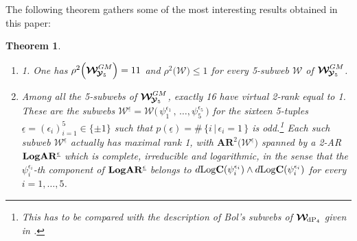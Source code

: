 \documentclass[11pt]{amsart}
\newcommand{\mk}{\medskip}
\newtheorem{thm}{Theorem}[section]
\begin{document}
The following theorem gathers some of the most interesting results obtained in this paper: 
\begin{thm} 
\label{THM:WdP5-WGMS5-similarities}
%
%
\begin{enumerate}
\item[]  \hspace{-1.2cm} {\rm 1.} One has  $\rho^{2}\Big(
\boldsymbol{\mathcal W}^{GM}_{ \hspace{-0.05cm}
\boldsymbol{\mathcal Y}_5}
\Big)= 11$ 
and $\rho^{2}\big(
\boldsymbol{\mathcal W}
\big)\leq 1$  for every 5-subweb  $\boldsymbol{\mathcal W}$ of $\boldsymbol{\mathcal W}^{GM}_{ \hspace{-0.05cm}
\boldsymbol{\mathcal Y}_5}$. 
\mk 
\item[2.] Among all the %
 5-subwebs of $\boldsymbol{\mathcal W}^{GM}_{ \hspace{-0.05cm}
\boldsymbol{\mathcal Y}_5}$, exactly 16 have virtual 2-rank equal to 1. These are the subwebs $\boldsymbol{\mathcal W}^{\underline{\epsilon}}=\boldsymbol{\mathcal W}\big(\, \psi_1^{\epsilon_1}\, , \, \ldots,  
\psi_5^{\epsilon_5}\,\big)$ for the sixteen 5-tuples $\underline{\epsilon}=(\epsilon_i)_{i=1}^5\in \{\pm 1\}$
such that $p(\underline{\epsilon})=\#\,\{ i%
 \, \lvert \, \epsilon_i=1\,\}$ is odd.\footnote{This has to be compared with the description of Bol's subwebs of 
$\boldsymbol{\mathcal W}_{  \hspace{-0.05cm} {\rm dP}_4}$ given in 
\cite[\S4.3]{PirioAFST}.} Each such subweb $\boldsymbol{\mathcal W}^{\underline{\epsilon}}$ actually  has maximal rank 1, with 
$\boldsymbol{AR}^{2}\big( \boldsymbol{\mathcal W}^{\underline{\epsilon}}\big)$
spanned by 
a
 2-AR %
${\bf LogAR}^{\underline{\epsilon}}$ which is complete, irreducible and logarithmic, in the sense  that the $\psi_i^{\epsilon_i}$-th component of 
 ${\bf LogAR}^{\underline{\epsilon}}$
belongs to $d{\rm Log}\mathbf C(\psi_i^{\epsilon_i})\wedge d{\rm Log}\mathbf C(\psi_i^{\epsilon_i})$  for every $i=1,\ldots,5$. 
\mk

\end{enumerate}
\end{thm}
\end{document}
